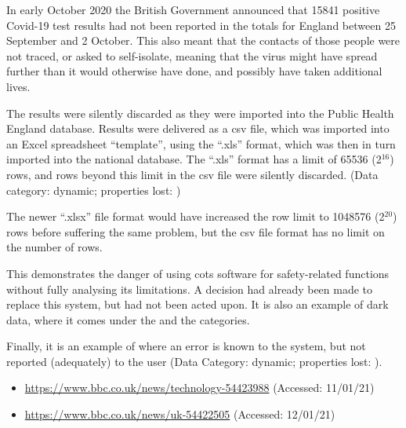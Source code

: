 In early October 2020 the British Government announced that 15841 positive Covid-19 test results had not been reported in the totals for England between 25 September and 2 October. This also meant that the contacts of those people were not traced, or asked to self-isolate, meaning that the virus might have spread further than it would otherwise have done, and possibly have taken additional lives.

The results were silently discarded as they were imported into the Public Health England \gls{database}. Results were delivered as a \gls{csv} file, which was imported into an Excel spreadsheet ``template'', using the ``.xls'' format, which was then in turn imported into the national \gls{database}. The ``.xls'' format has a limit of 65536 (2$^{16}$) rows, and rows beyond this limit in the \gls{csv} file were silently discarded. (Data category: dynamic; properties lost: )

The newer ``.xlsx'' file format would have increased the row limit to 1048576 (2$^{20}$) rows before suffering the same problem, but the \gls{csv} file format has no limit on the number of rows.

This demonstrates the danger of using \gls{cots} software for safety-related functions without fully analysing its limitations. A decision had already been made to replace this system, but had not been acted upon. It is also an example of dark data, where it comes under the
 and the  categories.

Finally, it is an example of where an error is known to the system, but not reported (adequately) to the user (Data Category: dynamic; properties lost: ).

\begin{itemize}
  \item\href{https://www.bbc.co.uk/news/technology-54423988}{https://www.bbc.co.uk/news/technology-54423988} (Accessed: 11/01/21)
  \item\href{https://www.bbc.co.uk/news/uk-54422505}{https://www.bbc.co.uk/news/uk-54422505} (Accessed: 12/01/21)
\end{itemize}



